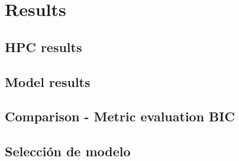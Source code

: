 \chapter{Results}

\section{HPC results}

\section{Model results}

\section{Comparison - Metric evaluation BIC}

\section{Selección de modelo}